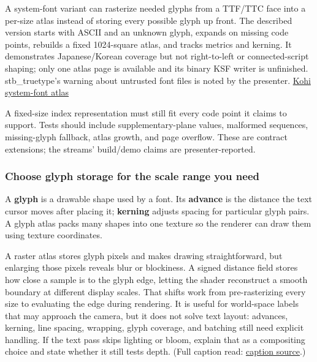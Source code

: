 A system-font variant can rasterize needed glyphs from a TTF/TTC face into a per-size atlas instead of storing every possible glyph up front. The described version starts with ASCII and an unknown glyph, expands on missing code points, rebuilds a fixed 1024-square atlas, and tracks metrics and kerning. It demonstrates Japanese/Korean coverage but not right-to-left or connected-script shaping; only one atlas page is available and its binary KSF writer is unfinished. stb\_truetype's warning about untrusted font files is noted by the presenter. \href{https://www.youtube.com/watch?v=ek_37ALWCqU}{Kohi system-font atlas}

A fixed-size index representation must still fit every code point it claims to support. Tests should include supplementary-plane values, malformed sequences, missing-glyph fallback, atlas growth, and page overflow. These are contract extensions; the streams' build/demo claims are presenter-reported.

\subsubsection{Choose glyph storage for the scale range you need}\label{06-engine-ii-ch026-choose-glyph-storage-for-the-scale-range-you-need}

\hypertarget{06-engine-ii-ch026-choose-glyph-storage-for-the-scale-range-you-need}{}

A \textbf{glyph} is a drawable shape used by a font. Its \textbf{advance} is the distance the text cursor moves after placing it; \textbf{kerning} adjusts spacing for particular glyph pairs. A glyph atlas packs many shapes into one texture so the renderer can draw them using texture coordinates.

A raster atlas stores glyph pixels and makes drawing straightforward, but enlarging those pixels reveals blur or blockiness. A signed distance field stores how close a sample is to the glyph edge, letting the shader reconstruct a smooth boundary at different display scales. That shifts work from pre-rasterizing every size to evaluating the edge during rendering. It is useful for world-space labels that may approach the camera, but it does not solve text layout: advances, kerning, line spacing, wrapping, glyph coverage, and batching still need explicit handling. If the text pass skips lighting or bloom, explain that as a compositing choice and state whether it still tests depth. (Full caption read: \href{https://www.youtube.com/watch?v=od_aKE_m38Y}{caption source}.)

